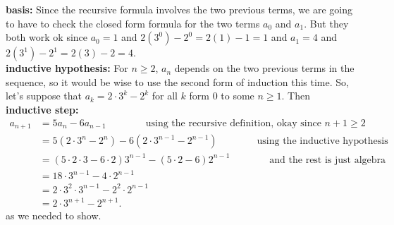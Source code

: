 \begin{Solution}{16.8}
{\bfseries basis:} Since the recursive formula involves the two previous terms, we are going to have to check the closed form formula for the two terms $a_0$ and $a_1$. But they both work ok since $a_0= 1$ and $2(3^0) - 2^0
= 2(1) - 1 = 1$ and $a_1 = 4$ and $2(3^1) - 2^1 = 2(3) - 2 = 4$.\\
{\bfseries inductive hypothesis:} For $n\geq 2$, $a_n$ depends on the two previous terms in the sequence, so it would be wise to use the second form of induction this time. So, let's suppose that $a_k = 2\cdot 3^k - 2^k$ for all $k$ form $0$ to some $n\geq 1$. Then\\
{\bfseries inductive step:} 
\begin{align*}
a_{n+1} &= 5a_{n} -6a_{n-1}\qquad\qquad\text{using the recursive definition, okay since } n+1\geq2\\
&=5(2\cdot3^{n}-2^{n}) - 6(2\cdot3^{n-1} -2^{n-1}) \qquad\qquad\text{using the inductive hypothesis}\\
&= (5\cdot2\cdot3 - 6\cdot2)3^{n-1} -(5\cdot2-6)2^{n-1}\qquad\qquad \text{and the rest is just algebra}\\
&=18\cdot3^{n-1} - 4\cdot2^{n-1}\\
&= 2\cdot3^2\cdot3^{n-1} - 2^2\cdot2^{n-1}\\
&= 2\cdot3^{n+1} - 2^{n+1}.
\end{align*}
as we needed to show.
\end{Solution}
